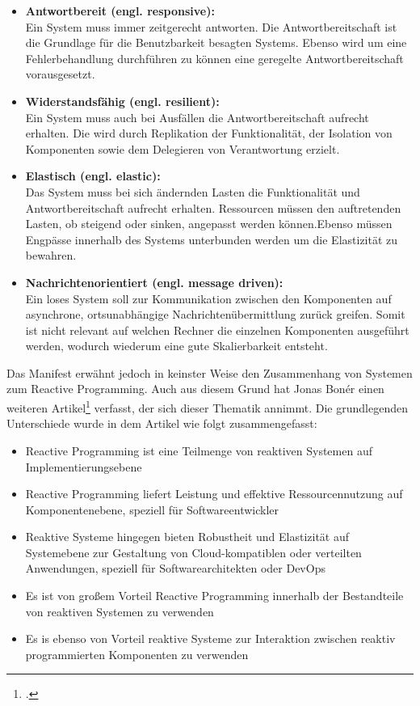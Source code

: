 \begin{itemize}
	\item \textbf{Antwortbereit (engl. responsive):}\\ Ein System muss immer zeitgerecht antworten. Die Antwortbereitschaft ist die Grundlage für die Benutzbarkeit besagten Systems. Ebenso wird um eine Fehlerbehandlung durchführen zu können eine geregelte Antwortbereitschaft vorausgesetzt.
	\item \textbf{Widerstandsfähig (engl. resilient):}\\ Ein System muss auch bei Ausfällen die Antwortbereitschaft aufrecht erhalten. Die wird durch Replikation der Funktionalität, der Isolation von Komponenten sowie dem Delegieren von Verantwortung erzielt. 
	\item \textbf{Elastisch (engl. elastic):}\\ Das System muss bei sich ändernden Lasten die Funktionalität und Antwortbereitschaft aufrecht erhalten. Ressourcen müssen den auftretenden Lasten, ob steigend oder sinken, angepasst werden können.Ebenso müssen Engpässe innerhalb des Systems unterbunden werden um die Elastizität zu bewahren.
	\item \textbf{Nachrichtenorientiert (engl. message driven):}\\ Ein loses System soll zur Kommunikation zwischen den Komponenten auf asynchrone, ortsunabhängige Nachrichtenübermittlung zurück greifen. Somit ist nicht relevant auf welchen Rechner die einzelnen Komponenten ausgeführt werden, wodurch wiederum eine gute Skalierbarkeit entsteht.
\end{itemize}
Das Manifest erwähnt jedoch in keinster Weise den Zusammenhang von Systemen zum Reactive Programming. Auch aus diesem Grund hat Jonas Bonér einen weiteren Artikel\footnote{\cite{Boner.}.} verfasst, der sich dieser Thematik annimmt. Die grundlegenden Unterschiede wurde in dem Artikel wie folgt zusammengefasst:
\begin{itemize}
	\item Reactive Programming ist eine Teilmenge von reaktiven Systemen auf Implementierungsebene
	\item Reactive Programming liefert Leistung und effektive Ressourcennutzung auf Komponentenebene, speziell für Softwareentwickler
	\item Reaktive Systeme hingegen bieten Robustheit und Elastizität auf Systemebene zur Gestaltung von Cloud-kompatiblen oder verteilten Anwendungen, speziell für Softwarearchitekten oder DevOps
	\item Es ist von großem Vorteil Reactive Programming innerhalb der Bestandteile von reaktiven Systemen zu verwenden
	\item Es is ebenso von Vorteil reaktive Systeme zur Interaktion zwischen reaktiv programmierten Komponenten zu verwenden
\end{itemize}
